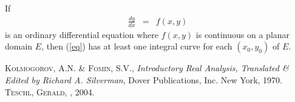 \documentclass[12pt]{article}
\begin{document}
If
\begin{eqnarray}\label{eq}
\frac{dy}{dx}&=&f(x,y)
\end{eqnarray}
is an ordinary differential equation where $f(x,y)$ is continuous 
on a planar domain $E$, then (\ref{eq}) has at least one integral 
curve for each $(x_0,y_0)$ of $E$.\cite{KF,T}

\begin{thebibliography}{1}
{\scshape Kolmogorov, A.N. \& Fomin, S.V.},
\emph{Introductory Real Analysis, Translated \& Edited by Richard A. Silverman}, Dover Publications, Inc. New York, 1970.
{\scshape Teschl, Gerald},
\emph{}
, 2004.
\end{thebibliography}
\end{document}
